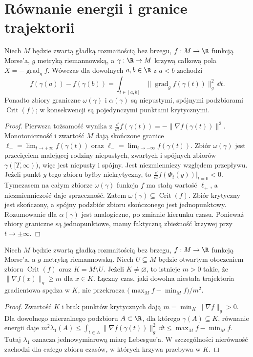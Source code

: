 \section{Równanie energii i granice trajektorii}
\begin{lemat}
\label{lem:morse-energy-analytic-v11}
Niech $M$ będzie zwartą gładką rozmaitością bez brzegu,
$f:M\to\R$ funkcją Morse'a, $g$ metryką riemannowską,
a $\gamma:\R\to M$ krzywą całkową pola
$X=-\operatorname{grad}_g f$.
Wówczas dla dowolnych $a,b\in\R$ z $a<b$ zachodzi
\[
 f(\gamma(a))-f(\gamma(b))=
 \int_{t\in[a,b]}\|\operatorname{grad}_g f(\gamma(t))\|_g^2\,\dd t.
\]
Ponadto zbiory graniczne $\omega(\gamma)$ i $\alpha(\gamma)$ są
niepustymi, spójnymi podzbiorami $\operatorname{Crit}(f)$;
w konsekwencji są pojedynczymi punktami krytycznymi.
\end{lemat}
\begin{proof}
Pierwsza tożsamość wynika z
$\tfrac{\dd}{\dd t}f(\gamma(t))=-\|\nabla f(\gamma(t))\|^2$.
Monotoniczność i zwartość $M$ dają skończone granice
$\ell_+=\lim_{t\to+\infty}f(\gamma(t))$ oraz
$\ell_-=\lim_{t\to-\infty}f(\gamma(t))$.
Zbiór $\omega(\gamma)$ jest przecięciem malejącej rodziny
niepustych, zwartych i spójnych zbiorów
$\overline{\gamma([T,\infty))}$, więc jest niepusty i spójny.
Jest niezmienniczy względem przepływu. Jeżeli punkt $y$ tego
zbioru byłby niekrytyczny, to
$\tfrac{\dd}{\dd t}f(\Phi_t(y))|_{t=0}<0$.
Tymczasem na całym zbiorze $\omega(\gamma)$ funkcja $f$
ma stałą wartość $\ell_+$, a niezmienniczość daje sprzeczność.
Zatem $\omega(\gamma)\subseteq\operatorname{Crit}(f)$.
Zbiór krytyczny jest skończony, a spójny podzbiór zbioru
skończonego jest jednopunktowy. Rozumowanie dla $\alpha(\gamma)$
jest analogiczne, po zmianie kierunku czasu. Ponieważ zbiory
graniczne są jednopunktowe, mamy faktyczną zbieżność krzywej
przy $t\to\pm\infty$.
\end{proof}

\begin{lemat}
\label{lem:morse-transit-v11}
Niech $M$ będzie zwartą gładką rozmaitością bez brzegu,
$f:M\to\R$ funkcją Morse'a, a $g$ metryką riemannowską.
Niech $U\subseteq M$ będzie otwartym otoczeniem zbioru
$\operatorname{Crit}(f)$ oraz $K=M\setminus U$.
Jeżeli $K\ne\varnothing$, to istnieje $m>0$ takie, że
$\|\nabla f(x)\|_g\ge m$ dla $x\in K$.
Łączny czas, jaki dowolna niestała trajektoria gradientowa
spędza w $K$, nie przekracza
$\bigl(\max_M f-\min_M f\bigr)/m^2$.
\end{lemat}
\begin{proof}
Zwartość $K$ i brak punktów krytycznych dają
$m=\min_K\|\nabla f\|_g>0$.
Dla dowolnego mierzalnego podzbioru $A\subset\R$, dla którego
$\gamma(A)\subseteq K$, równanie energii daje
$m^2\lambda_1(A)\le\int_{t\in A}\|\nabla f(\gamma(t))\|_g^2\,\dd t
\le\max_Mf-\min_Mf$.
Tutaj $\lambda_1$ oznacza jednowymiarową miarę Lebesgue'a.
W szczególności nierówność zachodzi dla całego zbioru czasów,
w których krzywa przebywa w $K$.
\end{proof}

